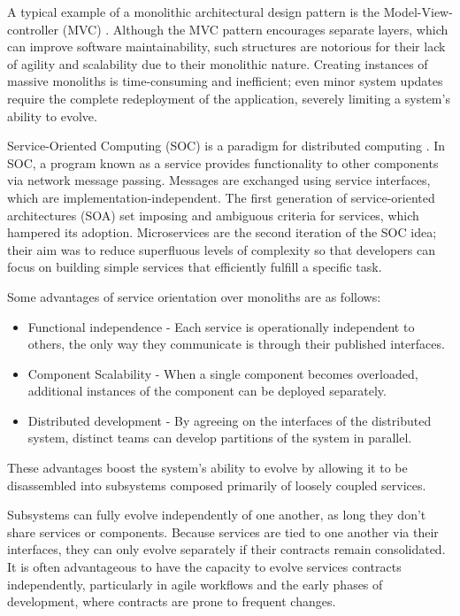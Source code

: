 A typical example of a monolithic architectural design pattern is the Model-View-controller (MVC) \cite{5}.
Although the MVC pattern encourages separate layers, which can improve software maintainability,
such structures are notorious for their lack of agility and scalability due to their monolithic nature.
Creating instances of massive monoliths is time-consuming and inefficient;
even minor system updates require the complete redeployment of the application, severely limiting a system's ability to evolve.

Service-Oriented Computing (SOC) is a paradigm for distributed computing \cite{6}.
In SOC, a program known as a service provides functionality to other components via network message passing.
Messages are exchanged using service interfaces, which are implementation-independent.
The first generation of service-oriented architectures (SOA) \cite{7} set imposing and ambiguous criteria for services, which hampered its adoption.
Microservices are the second iteration of the SOC idea;
their aim was to reduce superfluous levels of complexity so that developers can focus on building simple services that efficiently fulfill a specific task.

Some advantages of service orientation over monoliths are as follows:
\begin{itemize}
    \item Functional independence - Each service is operationally independent to others, the only way they communicate is through their published interfaces.
    \item Component Scalability - When a single component becomes overloaded, additional instances of the component can be deployed separately.
    \item Distributed development - By agreeing on the interfaces of the distributed system, distinct teams can develop partitions of the system in parallel.
\end{itemize}

These advantages boost the system's ability to evolve by allowing it to be disassembled into subsystems composed primarily of loosely coupled services.

Subsystems can fully evolve independently of one another, as long they don't share services or components.
Because services are tied to one another via their interfaces, they can only evolve separately if their contracts remain consolidated.
It is often advantageous to have the capacity to evolve services contracts independently,
particularly in agile workflows and the early phases of development, where contracts are prone to frequent changes.

